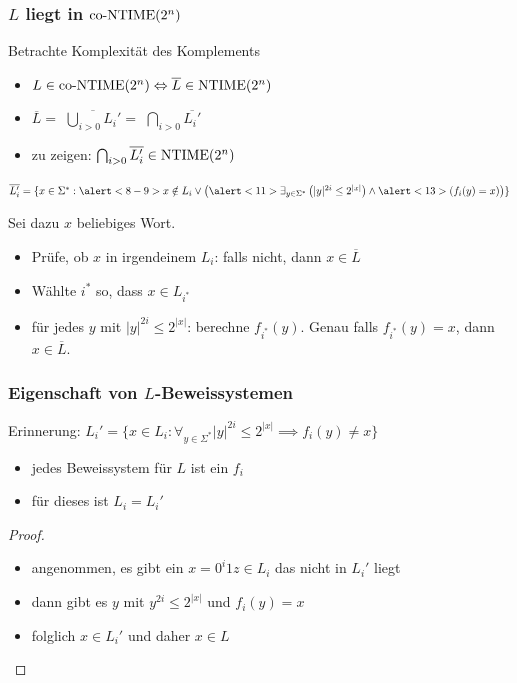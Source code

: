 \begin{frame}
  \frametitle{\(L\) liegt in \(\text{co-NTIME}(2^n)\)}

  Betrachte Komplexität des Komplements
  
  \begin{itemize}
   \item<2-> \(L \in \text{co-NTIME}(2^n) \Leftrightarrow \overline{L} \in \text{NTIME}(2^n)\)
   \item<3-> \(\overline{L} = \)  \( \overline{ \bigcup_{i>0} L_i' } = \)  \( \bigcap_{i>0} \overline{L_i'}\)
   \item<6-> zu zeigen: \( \bigcap_{i>0} \overline{L_i'} \in \text{NTIME}(2^n)\)
  \end{itemize}

  
  \(\overline{L_i'} = \{ x \in \Sigma^* : \alert<8-9>{ x \notin L_i } \vee \left( \alert<11>{ \exists_{y \in \Sigma^*} \left( |y|^{2i} \leq 2^{|x|} \right) } \wedge \alert<13>{ \left( f_i(y) = x \right) } \right)  \}\)

   Sei dazu \(x\) beliebiges Wort.

  \begin{itemize}
   \item<8-> Prüfe, ob \(x\) in irgendeinem \(L_i\):  \alert<9>{falls nicht, dann \(x \in \overline{L}\) }
   \item<10-> Wählte \(i^*\) so, dass \(x \in L_{i^*}\)
   \item<11-> \alert<11>{für jedes \(y\) mit \(|y|^{2i} \leq 2^{|x|}\)}:  berechne \(f_{i^*}(y)\).  \alert<13>{Genau falls \(f_{i^*}(y) = x\), dann \(x \in \overline{L}\).}
  \end{itemize}


  
\end{frame}


\begin{frame}
  \frametitle{Eigenschaft von \(L\)-Beweissystemen}

  Erinnerung: \(L_i' = \{ x \in L_i : \forall_{y \in \Sigma^*} |y|^{2i} \leq 2^{|x|} \implies f_i(y) \neq x \}\)
  
  \begin{itemize}
   \item<2-> jedes Beweissystem für \(L\) ist ein \(f_i\)
   \item<3-> für dieses ist \(L_i = L_i'\)
  \end{itemize}

  \begin{proof}
    \begin{itemize}
      \item<4-> angenommen, es gibt ein \(x = 0^i1z \in L_i\) das nicht in \(L_i'\) liegt
      \item<5-> dann gibt es \(y\) mit \(y^{2i} \leq 2^{|x|}\) und \(f_i(y) = x\)
      \item<6-> folglich \(x \in L_i'\) und daher \(x \in L\)
    \end{itemize}
  \end{proof}
\end{frame}

